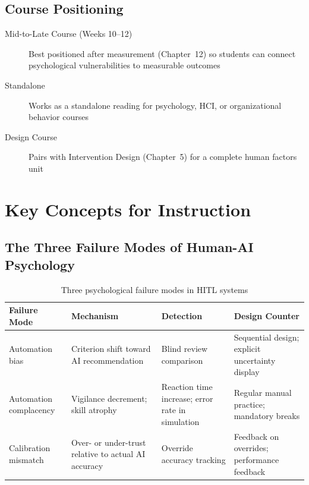 \subsection{Course Positioning}

\begin{description}
    \item[Mid-to-Late Course (Weeks 10--12)] Best positioned after measurement (Chapter~12) so students can connect psychological vulnerabilities to measurable outcomes
    \item[Standalone] Works as a standalone reading for psychology, HCI, or organizational behavior courses
    \item[Design Course] Pairs with Intervention Design (Chapter~5) for a complete human factors unit
\end{description}

\section{Key Concepts for Instruction}

\subsection{The Three Failure Modes of Human-AI Psychology}

\begin{table}[htbp]
\caption{Three psychological failure modes in HITL systems}
\label{tab:psych-failure-modes}
\centering
\begin{tabular}{@{}p{3cm}p{3cm}p{3cm}p{3.5cm}@{}}
\toprule
\textbf{Failure Mode} & \textbf{Mechanism} & \textbf{Detection} & \textbf{Design Counter} \\
\midrule
Automation bias & Criterion shift toward AI recommendation & Blind review comparison & Sequential design; explicit uncertainty display \\
Automation complacency & Vigilance decrement; skill atrophy & Reaction time increase; error rate in simulation & Regular manual practice; mandatory breaks \\
Calibration mismatch & Over- or under-trust relative to actual AI accuracy & Override accuracy tracking & Feedback on overrides; performance feedback \\
\bottomrule
\end{tabular}
\end{table}

